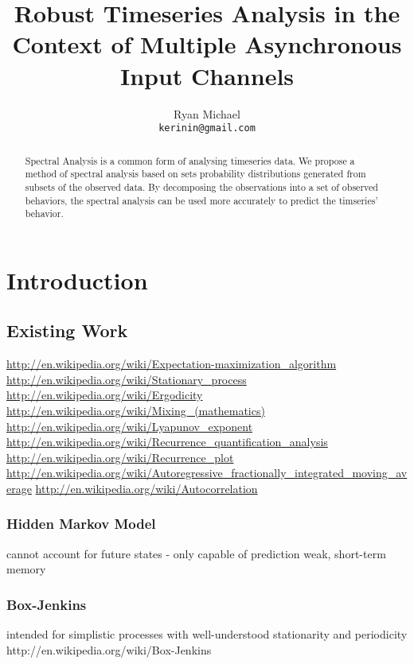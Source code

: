 \documentclass[10pt]{article}
\begin{document}
\title{Robust Timeseries Analysis in the Context of Multiple Asynchronous Input Channels}
\author{Ryan Michael\\ \texttt{kerinin@gmail.com}}
\date{}
\maketitle

\begin{abstract}
Spectral Analysis is a common form of analysing timeseries data.  We propose a method of spectral analysis based on sets probability distributions generated from subsets of the observed data.  By decomposing the observations into a set of observed behaviors, the spectral analysis can be used more accurately to predict the timseries' behavior.

\end{abstract}

\section{Introduction}

\subsection{Existing Work}
\url{http://en.wikipedia.org/wiki/Expectation-maximization_algorithm}
\url{http://en.wikipedia.org/wiki/Stationary_process}
\url{http://en.wikipedia.org/wiki/Ergodicity}
\url{http://en.wikipedia.org/wiki/Mixing_(mathematics)}
\url{http://en.wikipedia.org/wiki/Lyapunov_exponent}
\url{http://en.wikipedia.org/wiki/Recurrence_quantification_analysis}
\url{http://en.wikipedia.org/wiki/Recurrence_plot}
\url{http://en.wikipedia.org/wiki/Autoregressive_fractionally_integrated_moving_average}
\url{http://en.wikipedia.org/wiki/Autocorrelation}

\subsubsection{Hidden Markov Model}
cannot account for future states - only capable of prediction
weak, short-term memory

\subsubsection{Box-Jenkins}
intended for simplistic processes with well-understood stationarity and periodicity
http://en.wikipedia.org/wiki/Box-Jenkins
\end{document}
